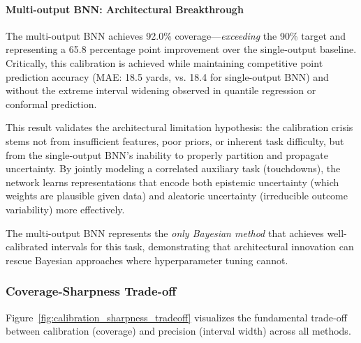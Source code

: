 \paragraph{Multi-output BNN: Architectural Breakthrough}

The multi-output BNN achieves 92.0\% coverage—\textit{exceeding} the 90\% target and representing a 65.8 percentage point improvement over the single-output baseline. Critically, this calibration is achieved while maintaining competitive point prediction accuracy (MAE: 18.5 yards, vs. 18.4 for single-output BNN) and without the extreme interval widening observed in quantile regression or conformal prediction.

This result validates the architectural limitation hypothesis: the calibration crisis stems not from insufficient features, poor priors, or inherent task difficulty, but from the single-output BNN's inability to properly partition and propagate uncertainty. By jointly modeling a correlated auxiliary task (touchdowns), the network learns representations that encode both epistemic uncertainty (which weights are plausible given data) and aleatoric uncertainty (irreducible outcome variability) more effectively.

The multi-output BNN represents the \textit{only Bayesian method} that achieves well-calibrated intervals for this task, demonstrating that architectural innovation can rescue Bayesian approaches where hyperparameter tuning cannot.

\subsubsection{Coverage-Sharpness Trade-off}

Figure~\ref{fig:calibration_sharpness_tradeoff} visualizes the fundamental trade-off between calibration (coverage) and precision (interval width) across all methods.

